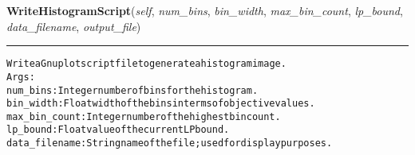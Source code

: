     \label{coinor:grumpy:BB:BBTree:WriteHistogramScript}

    \vspace{0.5ex}

\hspace{.8\funcindent}\begin{boxedminipage}{\funcwidth}

    \raggedright \textbf{WriteHistogramScript}(\textit{self}, \textit{num\_bins}, \textit{bin\_width}, \textit{max\_bin\_count}, \textit{lp\_bound}, \textit{data\_filename}, \textit{output\_file})

    \vspace{-1.5ex}

    \rule{\textwidth}{0.5\fboxrule}
\setlength{\parskip}{2ex}
\begin{alltt}

Write a Gnuplot script file to generate a histogram image.
Args:
  num\_bins: Integer number of bins for the histogram.
  bin\_width: Float width of the bins in terms of objective values.
  max\_bin\_count: Integer number of the highest bin count.
  lp\_bound: Float value of the current LP bound.
  data\_filename: String name of the file; used for display purposes.
\end{alltt}

\setlength{\parskip}{1ex}
    \end{boxedminipage}

    \label{coinor:grumpy:BB:BBTree:AdjustHistogramEndBins}

    \vspace{0.5ex}


